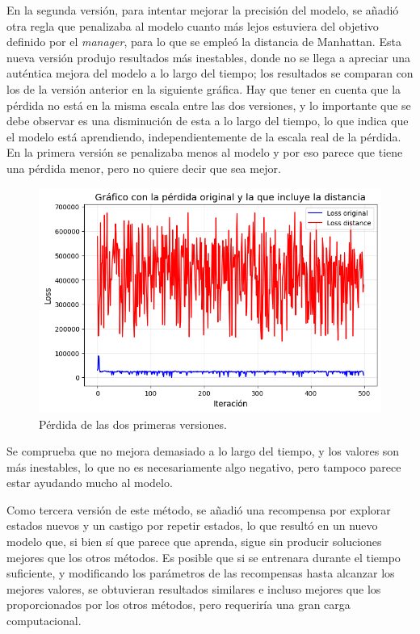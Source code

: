 \documentclass[letterpaper]{article} %
\begin{document}
En la segunda versión, para intentar mejorar la precisión del modelo, se añadió otra regla que penalizaba al modelo cuanto más lejos estuviera del objetivo definido por el \textit{manager}, para lo que se empleó la distancia de Manhattan. Esta nueva versión 
produjo resultados más inestables, donde no se llega a apreciar una auténtica mejora del modelo a lo largo del tiempo; los resultados se comparan con los de la versión anterior en la siguiente gráfica. Hay que tener en cuenta que la pérdida no está
en la misma escala entre las dos versiones, y lo importante que se debe observar es una disminución de esta a lo largo del tiempo, lo que indica que el modelo está aprendiendo, independientemente de la escala real de la pérdida. En la primera versión se 
penalizaba menos al modelo y por eso parece que tiene una pérdida menor, pero no quiere decir que sea mejor.

\begin{figure}[H]
    \centering
    \includegraphics[width=0.9\columnwidth]{FuN_2.png}
    \caption{Pérdida de las dos primeras versiones.\label{fig:FuN4}}
\end{figure}

Se comprueba que no mejora demasiado a lo largo del tiempo, y los valores son más inestables, lo que no es necesariamente algo negativo, pero tampoco parece estar ayudando mucho al modelo.

Como tercera versión de este método, se añadió una recompensa por explorar estados nuevos y un castigo por repetir estados, lo que resultó en un nuevo modelo que, si bien sí que parece que aprenda, sigue sin producir soluciones mejores que los otros métodos. Es posible que si se entrenara durante el 
tiempo suficiente, y modificando los parámetros de las recompensas hasta alcanzar los mejores valores, se obtuvieran resultados similares e incluso mejores que los proporcionados por los otros métodos, pero requeriría una gran carga computacional.
\end{document}
